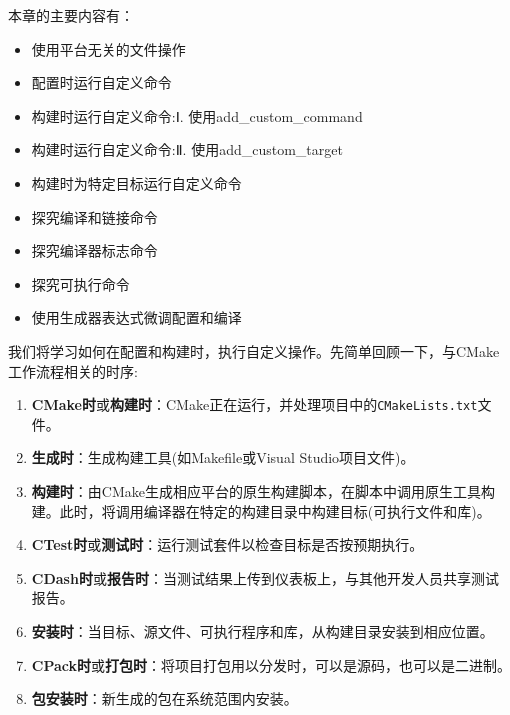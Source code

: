 本章的主要内容有：

\begin{itemize}
\item 使用平台无关的文件操作

\item 配置时运行自定义命令

\item 构建时运行自定义命令:Ⅰ. 使用add\_custom\_command

\item 构建时运行自定义命令:Ⅱ. 使用add\_custom\_target

\item 构建时为特定目标运行自定义命令

\item 探究编译和链接命令

\item 探究编译器标志命令

\item 探究可执行命令

\item 使用生成器表达式微调配置和编译

\end{itemize}

我们将学习如何在配置和构建时，执行自定义操作。先简单回顾一下，与CMake工作流程相关的时序:

\begin{enumerate}
\item \textbf{CMake时}或\textbf{构建时}：CMake正在运行，并处理项目中的\texttt{CMakeLists.txt}文件。

\item \textbf{生成时}：生成构建工具(如Makefile或Visual Studio项目文件)。

\item \textbf{构建时}：由CMake生成相应平台的原生构建脚本，在脚本中调用原生工具构建。此时，将调用编译器在特定的构建目录中构建目标(可执行文件和库)。

\item \textbf{CTest时}或\textbf{测试时}：运行测试套件以检查目标是否按预期执行。

\item \textbf{CDash时}或\textbf{报告时}：当测试结果上传到仪表板上，与其他开发人员共享测试报告。

\item \textbf{安装时}：当目标、源文件、可执行程序和库，从构建目录安装到相应位置。

\item \textbf{CPack时}或\textbf{打包时}：将项目打包用以分发时，可以是源码，也可以是二进制。

\item \textbf{包安装时}：新生成的包在系统范围内安装。

\end{enumerate}

